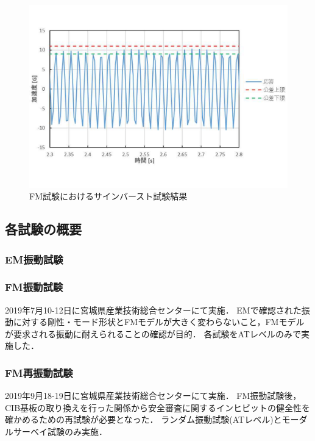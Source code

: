 \begin{figure}[H]
	\centering
	\includegraphics[width=1\linewidth]{04/fig/4-3-6.pdf}
	\caption{FM試験におけるサインバースト試験結果\cite{FM_vibration_test_report}}
	\label{fig4-3-1}
\end{figure}


\subsection{各試験の概要}
\subsubsection{EM振動試験}


\subsubsection{FM振動試験}
2019年7月10-12日に宮城県産業技術総合センターにて実施．
EMで確認された振動に対する剛性・モード形状とFMモデルが大きく変わらないこと，FMモデルが要求される振動に耐えられることの確認が目的．
各試験をATレベルのみで実施した．

\subsubsection{FM再振動試験}
2019年9月18-19日に宮城県産業技術総合センターにて実施．
FM振動試験後，CIB基板の取り換えを行った関係から安全審査に関するインヒビットの健全性を確かめるための再試験が必要となった．
ランダム振動試験(ATレベル)とモーダルサーベイ試験のみ実施．

